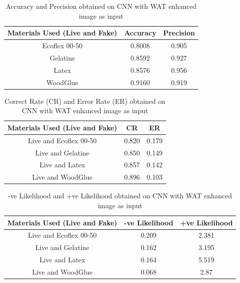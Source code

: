 \begin{table}[h]
\caption {Accuracy and Precision obtained on CNN with WAT enhanced image as input} \label{tab:1} 
\begin{center}
\begin{tabular}{|c|c|c|} 
 \hline
 Materials Used (Live and Fake) & Accuracy & Precision\\ 
 \hline
 Ecoflex 00-50 & 0.8008 & 0.905 \\
 \hline
Gelatine & 0.8592 & 0.927\\
 \hline
Latex & 0.8576 & 0.956\\
\hline
WoodGlue & 0.9160 & 0.919\\
\hline
\end{tabular}
\end{center}
\end{table}
 
\begin{table}[h]
\caption {Correct Rate (CR) and Error Rate (ER) obtained on CNN with WAT enhanced image as input}
\label{tab:12} 
\begin{center}
\begin{tabular}{|c|c|c|}
 \hline 
 Materials Used (Live and Fake) & CR & ER \\ 
 \hline 
 Live and Ecoflex 00-50 & 0.820 & 0.179\\ 
 \hline 
  Live and Gelatine & 0.850 & 0.149 \\
 \hline 
  Live and Latex & 0.857 & 0.142\\ 
 \hline 
  Live and WoodGlue & 0.896 & 0.103 \\ 
 \hline 
 \end{tabular}  
 \end{center}
\end{table}

\begin{table}[h]
\caption {-ve Likelihood and +ve Likelihood obtained on CNN with WAT enhanced image as input}
\label{tab:13}
\begin{center}
\begin{tabular}{|c|c|c|}
 \hline 
 Materials Used (Live and Fake) & -ve Likelihood & +ve Likelihood \\ 
 \hline 
 Live and Ecoflex 00-50 &  0.209 & 2.381 \\ 
 \hline 
  Live and Gelatine &  0.162 & 3.195 \\
 \hline 
  Live and Latex & 0.164 & 5.519 \\ 
 \hline 
  Live and WoodGlue & 0.068 & 2.87 \\ 
 \hline 
 \end{tabular}  
 \end{center}
 \end{table}

